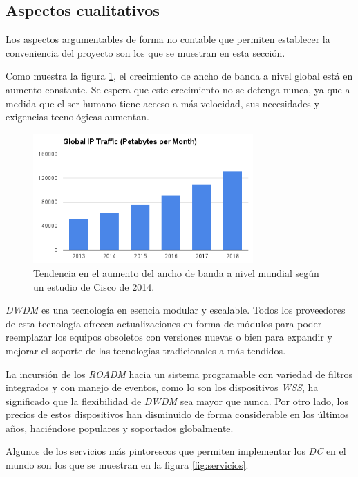 \subsection{Aspectos cualitativos}
\label{sec:cualitativos}

Los aspectos argumentables de forma no contable que permiten
establecer la conveniencia del proyecto son los que se muestran en
esta sección.

Como muestra la figura \ref{fig:aumento_bw}, el crecimiento de ancho
de banda a nivel global está en aumento constante. Se espera que este
crecimiento no se detenga nunca, ya que a medida que el ser humano
tiene acceso a más velocidad, sus necesidades y exigencias tecnológicas
aumentan.

\begin{figure}[H]
  \centering
  \includegraphics[width=0.75\textwidth]{Imagenes/iptrafficchart.png}
  \caption{Tendencia en el aumento del ancho de banda a nivel mundial
    según un estudio de Cisco de 2014.\cite{ciscoiptraffic}}
  \label{fig:aumento_bw}
\end{figure}

\emph{DWDM} es una tecnología en esencia modular y escalable. Todos
los proveedores de esta tecnología ofrecen actualizaciones en forma de
módulos para poder reemplazar los equipos obsoletos con versiones
nuevas o bien para expandir y mejorar el soporte de las tecnologías
tradicionales a más tendidos.

La incursión de los \emph{ROADM} hacia un sistema programable con
variedad de filtros integrados y con manejo de eventos, como lo son
los dispositivos \emph{WSS}, ha significado que la flexibilidad de
\emph{DWDM} sea mayor que nunca. Por otro lado, los precios de estos
dispositivos han disminuido de forma considerable en los últimos años,
haciéndose populares y soportados globalmente.

Algunos de los servicios más pintorescos que permiten implementar los
\emph{DC} en el mundo son los que se muestran en la figura
\ref{fig:servicios}.

